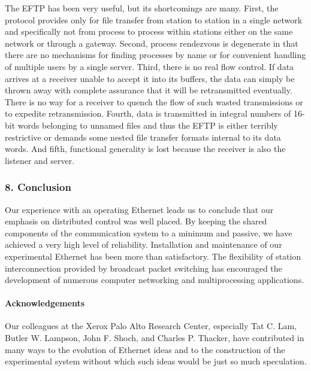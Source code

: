 The EFTP has been very useful, but its shortcomings are many. First, the protocol provides only for file transfer from station to station in a single network and specifically not from process to process within stations either on the same network or through a gateway. Second, process rendezvous is degenerate in that there are no mechanisms for finding processes by name or for convenient handling of multiple users by a single server. Third, there is no real flow control. If data arrives at a receiver unable to accept it into its buffers, the data can simply be thrown away with complete assurance that it will be retransmitted eventually. There is no way for a receiver to quench the flow of such wasted transmissions or to expedite retransmission. Fourth, data is transmitted in integral numbers of 16-bit words belonging to unnamed files and thus the EFTP is either terribly restrictive or demands some nested file transfer formats internal to its data words. And fifth, functional generality is lost because the receiver is also the listener and server.


\subsubsection*{8. Conclusion}
\vspace{-6pt}
Our experience with an operating Ethernet leads us to conclude that our emphasis on distributed control was well placed. By keeping the shared components of the communication system to a minimum and passive, we have achieved a very high level of reliability. Installation and maintenance of our experimental Ethernet has been more than satisfactory. The flexibility of station interconnection provided by broadcast packet switching has encouraged the development of numerous computer networking and multiprocessing applications.


\paragraph{Acknowledgements} Our colleagues at the Xerox Palo Alto Research Center, especially Tat C. Lam, Butler W. Lampson, John F. Shoch, and Charles P. Thacker, have contributed in many ways to the evolution of Ethernet ideas and to the construction of the experimental system without which such ideas would be just so much speculation.



\footnotesize

